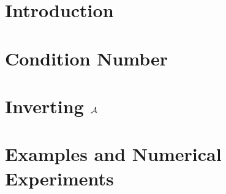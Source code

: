 \section{Introduction}
\label{sec:meas_intro}

\section{Condition Number}
\label{sec:con_number}

\section{Inverting $\mathcal{A}$}
\label{sec:meas_expl_inv}

\section{Examples and Numerical Experiments}
\label{sec:span_fam_ex}

